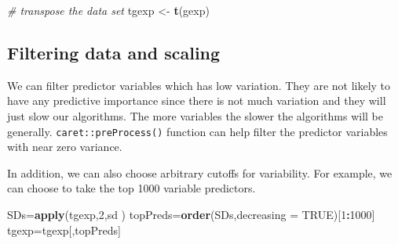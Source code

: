 \documentclass[12pt,]{krantz}
\newenvironment{Shaded}{\begin{snugshade}}{\end{snugshade}}
\newcommand{\CommentTok}[1]{\textcolor[rgb]{0.56,0.35,0.01}{\textit{#1}}}
\newcommand{\DataTypeTok}[1]{\textcolor[rgb]{0.13,0.29,0.53}{#1}}
\newcommand{\DecValTok}[1]{\textcolor[rgb]{0.00,0.00,0.81}{#1}}
\newcommand{\KeywordTok}[1]{\textcolor[rgb]{0.13,0.29,0.53}{\textbf{#1}}}
\newcommand{\NormalTok}[1]{#1}
\newcommand{\OperatorTok}[1]{\textcolor[rgb]{0.81,0.36,0.00}{\textbf{#1}}}
\newcommand{\OtherTok}[1]{\textcolor[rgb]{0.56,0.35,0.01}{#1}}
\newcommand{\StringTok}[1]{\textcolor[rgb]{0.31,0.60,0.02}{#1}}
\begin{document}
\begin{Shaded}
\begin{Highlighting}[]
\CommentTok{# transpose the data set}
\NormalTok{tgexp <-}\StringTok{ }\KeywordTok{t}\NormalTok{(gexp)}
\end{Highlighting}
\end{Shaded}

\hypertarget{filtering-data-and-scaling}{%
\subsection{Filtering data and scaling}\label{filtering-data-and-scaling}}

We can filter predictor variables which has low variation. They are not likely to have any predictive importance since there is not much variation and they will just slow our algorithms. The more variables the slower the algorithms will be generally. \texttt{caret::preProcess()} function can help filter the predictor variables with near zero variance.

\begin{Shaded}
\end{Shaded}

In addition, we can also choose arbitrary cutoffs for variability. For example, we can choose to take the top 1000 variable predictors.

\begin{Shaded}
\begin{Highlighting}[]
\NormalTok{SDs=}\KeywordTok{apply}\NormalTok{(tgexp,}\DecValTok{2}\NormalTok{,sd )}
\NormalTok{topPreds=}\KeywordTok{order}\NormalTok{(SDs,}\DataTypeTok{decreasing =} \OtherTok{TRUE}\NormalTok{)[}\DecValTok{1}\OperatorTok{:}\DecValTok{1000}\NormalTok{]}
\NormalTok{tgexp=tgexp[,topPreds]}
\end{Highlighting}
\end{Shaded}
\end{document}
